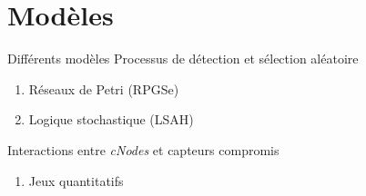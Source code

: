 \documentclass[aspectratio=43]{beamer} %
\newcommand\cn{\textit{cNode}\xspace}
\newcommand\cns{\textit{cNodes}\xspace}
\begin{document}
\section{Modèles}
\begin{frame}{Différents modèles}
  Processus de détection et sélection aléatoire
  \begin{enumerate}
    \item Réseaux de Petri (RPGSe)
    \item Logique stochastique (LSAH)
    \setcounter{enb}{\theenumi}
  \end{enumerate}

  \bigskip

  Interactions entre \cns et capteurs compromis
  \begin{enumerate}
    \setcounter{enumi}{\theenb}
    \item Jeux quantitatifs
  \end{enumerate}
\end{frame}
\end{document}

